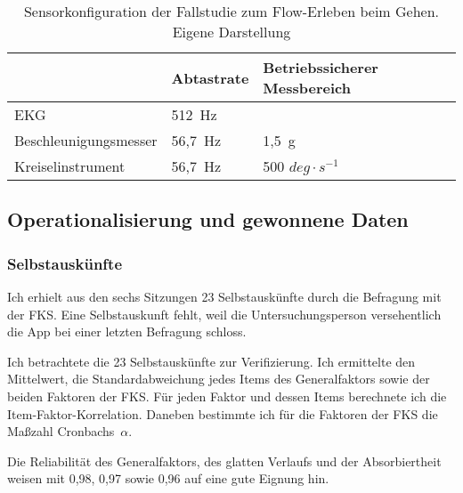 \begin{table}[t]
	\caption[Sensorkonfiguration der Fallstudie zum Flow-Erleben beim Gehen]{Sensorkonfiguration der Fallstudie zum Flow-Erleben beim Gehen. Eigene Darstellung}
	\label{tab:sensorkonfiguration_fallstudie_gehen}
	\begin{tabularx}{\textwidth}{p{} p{} p{}}
\toprule
& Abtastrate & Betriebssicherer Messbereich \\
\midrule
EKG & 512~Hz & \\
Beschleunigungsmesser & 56,7~Hz & 1,5~g \\
Kreiselinstrument & 56,7~Hz & 500 $deg \cdot s^{-1}$ \\
\bottomrule
\end{tabularx}
\end{table}

\subsection{Operationalisierung und gewonnene Daten}
\subsubsection{Selbstauskünfte}

Ich erhielt aus den sechs Sitzungen 23 Selbstauskünfte durch die Befragung mit der \ac{FKS}. Eine Selbstauskunft fehlt, weil die Untersuchungsperson versehentlich die App bei einer letzten Befragung schloss.

Ich betrachtete die 23 Selbstauskünfte zur Verifizierung. Ich ermittelte den Mittelwert, die Standardabweichung jedes Items des Generalfaktors sowie der beiden Faktoren der \ac{FKS}. Für jeden Faktor und dessen Items berechnete ich die Item-Faktor-Korrelation. Daneben bestimmte ich für die Faktoren der \ac{FKS} die Maßzahl Cronbachs~$\alpha$.

Die Reliabilität des Generalfaktors, des glatten Verlaufs und der Absorbiertheit weisen mit 0,98, 0,97 sowie 0,96 auf eine gute Eignung hin. 

